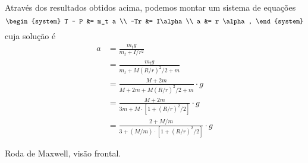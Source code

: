 Através dos resultados obtidos acima, podemos montar um sistema de equações
\begin{equation}
\begin{system}
    T - P &= m_t a \\
    -Tr &= I\alpha \\
    a &= r \alpha,
\end{system}
\end{equation}
%
cuja solução é
\begin{align}
    a &= \frac{m_t g}{m_t + I / r^2} \label{Eq:AcelRodaDeMaxwellGenerica}\\
    &= \frac{m_tg}{m_t + M(R/r)^2/2 + m} \\
    &= \frac{M + 2m}{M + 2m + M(R/r)^2/2 + m} \cdot g \\
    &= \frac{M + 2m}{3m + M \cdot [1 + (R/r)^2/2]} \cdot g \\
    &= \frac{2 + M/m}{3 + (M/m) \cdot [1 + (R/r)^2/2]} \cdot g
\end{align}

\begin{marginfigure}[1.5cm]
\centering
{}
\caption{Roda de Maxwell, visão frontal.\label{Fig:RodaDeMaxwellVisaoFrontal}}
\end{marginfigure}

